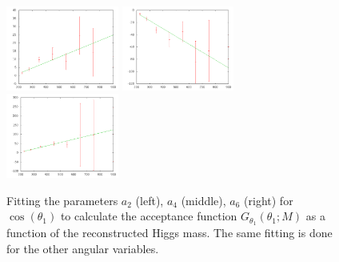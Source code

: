 \begin{figure}[htb!]
\begin{center}
\centerline{
\includegraphics[width=0.33\textwidth]{Optimization/a2.pdf}
\includegraphics[width=0.33\textwidth]{Optimization/a4.pdf}
\includegraphics[width=0.33\textwidth]{Optimization/a6.pdf}
}
\caption{
Fitting the parameters $a_2$ (left), $a_4$ (middle), $a_6$ (right) for $\cos(\theta_1)$ to calculate the acceptance function $G_{\theta_1}(\theta_1;M)$ as a function of the reconstructed Higgs mass.  The same fitting is done for the other angular variables.
}
\label{fig:fit_poly}
\end{center}
\end{figure}

